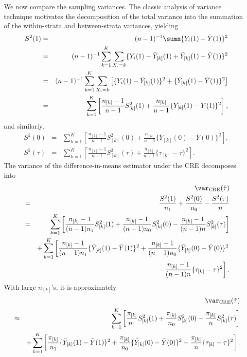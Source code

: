 We now compare the sampling variances. The  classic analysis of variance technique motivates the decomposition of the total variance into the summation of the within-strata and between-strata variances, yielding
\begin{eqnarray*}
S^2(1) &=&  (n-1)^{-1} \sumn \{  Y_i(1) - \bar{Y}(1) \}^2 \\
&=& (n-1)^{-1} \sum_{k=1}^K \sum_{X_i   = k} \{ Y_i(1) - \bar{Y}_{[k]}(1)  + \bar{Y}_{[k]}(1)  -   \bar{Y}(1)  \}^2 \\
&=& (n-1)^{-1} \sum_{k=1}^K \sum_{X_i   = k} \left[  \{ Y_i(1) - \bar{Y}_{[k]}(1) \}^2 +  \{ \bar{Y}_{[k]}(1)  -   \bar{Y}(1)  \}^2 \right] \\
&=& \sum_{k=1}^K \left[   \frac{n_{[k]} - 1}{n-1}   S_{[k]}^2(1)  +  \frac{ n_{[k]}}{ n-1} \{ \bar{Y}_{[k]}(1) - \bar{Y}(1) \}^2  \right],
\end{eqnarray*} 
and similarly,
\begin{eqnarray*}
S^2(0) &=& \sum_{k=1}^K \left[   \frac{n_{[k]} - 1}{n-1}   S_{[k]}^2(0)  +  \frac{ n_{[k]}}{ n-1} \{ \bar{Y}_{[k]}(0) - \bar{Y}(0) \}^2  \right],\\
S^2(\tau) &=& \sum_{k=1}^K \left[   \frac{n_{[k]} - 1}{n-1}   S_{[k]}^2(\tau)  +  \frac{ n_{[k]}}{ n-1} \{ \tau_{[k]} - \tau \}^2  \right] .
\end{eqnarray*}
The variance of the difference-in-means estimator under the CRE decomposes into 
\begin{eqnarray*}
&&\var_{\text{CRE}}(  \hat{\tau} )  \\
&=& \frac{S^2(1)}{ n_{1} } +  \frac{S^2(0)}{ n_{0} }
- \frac{  S^2(\tau) }{ n }  \\ 
&=& \sum_{k=1}^K  \left[   \frac{ n_{[k]} - 1}{(n-1)n_1}  S_{[k]}^2(1) + \frac{ n_{[k]} - 1}{ (n-1)n_0}  S_{[k]}^2(0) -  \frac{ n_{[k]} - 1}{(n-1)n}    S_{[k]}^2(\tau) \right] \\
&&  + \sum_{k=1}^K  \left[    \frac{ n_{[k]} - 1}{ (n-1)n_1}  \{ \bar{Y}_{[k]}(1) - \bar{Y}(1) \}^2 +  \frac{ n_{[k]} - 1}{ (n-1)n_0}  \{ \bar{Y}_{[k]}(0) - \bar{Y}(0) \}^2   \right. \\
&& \left.  - \frac{ n_{[k]} - 1  }{ (n-1)n} \{ \tau_{[k]} - \tau \}^2  \right] .
 \end{eqnarray*}
 With large $n_{[k]}$'s, it is approximately
 \begin{eqnarray*}
 &&\var_{\text{CRE}}(  \hat{\tau} )  \\
&\approx & 
\sum_{k=1}^K  \left[   \frac{ \pi_{[k]}}{n_1}  S_{[k]}^2(1) + \frac{ \pi_{[k]}}{n_0}  S_{[k]}^2(0) -  \frac{ \pi_{[k]}}{n}    S_{[k]}^2(\tau) \right] \\
&&  + \sum_{k=1}^K  \left[    \frac{ \pi_{[k]}}{n_1}  \{ \bar{Y}_{[k]}(1) - \bar{Y}(1) \}^2 +  \frac{ \pi_{[k]}}{n_0}  \{ \bar{Y}_{[k]}(0) - \bar{Y}(0) \}^2  
 - \frac{ \pi_{[k]}  }{n} \{ \tau_{[k]} - \tau \}^2  \right] .
\end{eqnarray*}
